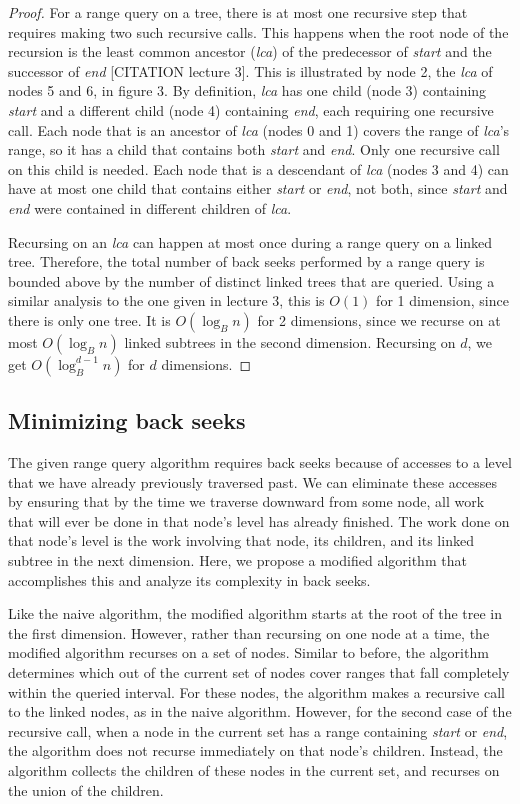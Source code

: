 \documentclass[11pt, oneside]{article}
\newcommand{\ms}{\textit}
\begin{document}
\begin{proof}
    For a range query on a tree, there is at most one recursive step that
    requires making two such recursive calls. This happens when the root node
    of the recursion is the least common ancestor (\ms{lca}) of the predecessor
    of \ms{start} and the successor of \ms{end} [CITATION lecture 3]. This is
    illustrated by node 2, the \ms{lca} of nodes 5 and 6, in figure 3. By
    definition, \ms{lca} has one child (node 3) containing \ms{start} and a
    different child (node 4) containing \ms{end}, each requiring one recursive
    call. Each node that is an ancestor of \ms{lca} (nodes 0 and 1) covers the range
    of \ms{lca}'s range, so it has a child that contains both \ms{start} and
    \ms{end}. Only one recursive call on this child is needed. Each node that
    is a descendant of \ms{lca} (nodes 3 and 4) can have at most one child that
    contains either \ms{start} or \ms{end}, not both, since \ms{start} and
    \ms{end} were contained in different children of \ms{lca}. 

    Recursing on an \ms{lca} can happen at most once during a range query on a
    linked tree. Therefore, the total number of back seeks performed by a range
    query is bounded above by the number of distinct linked trees that are
    queried. Using a similar analysis to the one given in lecture 3, this is
    $O(1)$ for 1 dimension, since there is only one tree. It is $O(\log_B n)$
    for 2 dimensions, since we recurse on at most $O(\log_B n)$ linked subtrees
    in the second dimension. Recursing on $d$, we get $O(\log_B^{d-1}n)$ for
    $d$ dimensions.

\end{proof}

\subsection{Minimizing back seeks}

The given range query algorithm requires back seeks because of accesses to a
level that we have already previously traversed past. We can eliminate these
accesses by ensuring that by the time we traverse downward from some node, all
work that will ever be done in that node's level has already finished. The work
done on that node's level is the work involving that node, its children, and
its linked subtree in the next dimension. Here, we propose a modified algorithm
that accomplishes this and analyze its complexity in back seeks.

Like the naive algorithm, the modified algorithm starts at the root of the tree
in the first dimension. However, rather than recursing on one node at a time,
the modified algorithm recurses on a set of nodes. Similar to before, the
algorithm determines which out of the current set of nodes cover ranges that
fall completely within the queried interval. For these nodes, the algorithm
makes a recursive call to the linked nodes, as in the naive algorithm. However,
for the second case of the recursive call, when a node in the current set has a
range containing \ms{start} or \ms{end}, the algorithm does not recurse
immediately on that node's children. Instead, the algorithm collects the
children of these nodes in the current set, and recurses on the union of the
children.
\end{document}
